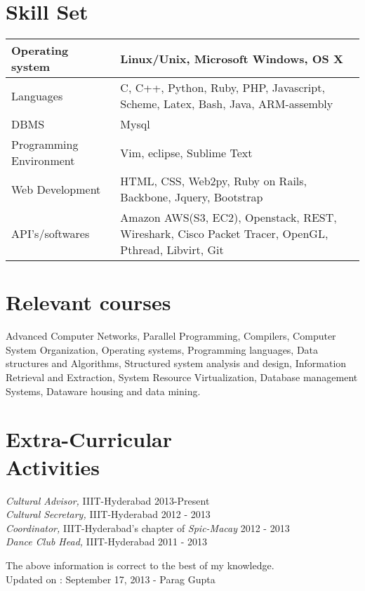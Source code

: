 \documentclass[margin]{res}
\begin{document}
\begin{resume}
\section{
Skill Set}

\begin{table}[htbp]
\begin{tabular}[ht]{|l | p{7cm} |}
\hline
Operating system & Linux/Unix, Microsoft Windows, OS X \\
\hline
Languages & C, C++, Python, Ruby, PHP, Javascript, Scheme, Latex, Bash, Java, ARM-assembly \\
\hline
DBMS & Mysql \\
\hline
Programming Environment & Vim, eclipse, Sublime Text \\
\hline
Web Development & HTML, CSS, Web2py, Ruby on Rails, Backbone, Jquery, Bootstrap \\
\hline
API's/softwares
& Amazon AWS(S3, EC2),
Openstack, REST, Wireshark, Cisco Packet Tracer,
OpenGL, Pthread, Libvirt, Git \\
\hline

\end{tabular}
\end{table}

\section{Relevant courses}
Advanced Computer Networks, Parallel Programming, Compilers, Computer System Organization, Operating systems, Programming languages, Data structures and Algorithms, Structured system analysis and design, Information Retrieval and Extraction, System Resource Virtualization, Database management Systems, Dataware housing and data mining.


\section{Extra-Curricular \\ Activities}
{\it Cultural Advisor,} IIIT-Hyderabad \hfill{2013-Present} \\
{\it Cultural Secretary,} IIIT-Hyderabad  \hfill{2012 - 2013} \\
{\it Coordinator,} IIIT-Hyderabad's chapter of {\it Spic-Macay} \hfill{2012 - 2013} \\
{\it Dance Club Head,} IIIT-Hyderabad \hfill{2011 - 2013}
            
\noindent The above information is correct to the best of my knowledge.\\
Updated on : September 17, 2013 \hfill{- Parag Gupta} 


\end{resume}
\end{document}
